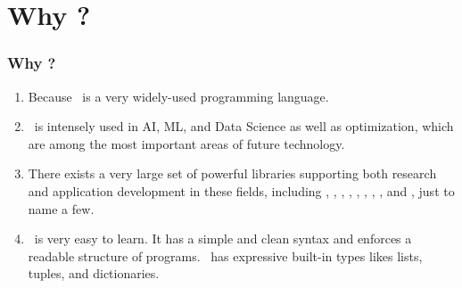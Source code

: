 \documentclass[aspectratio=169,mathserif,notheorems]{beamer}%
\begin{document}
\section{Why \python?}%
%
\begin{frame}[t]%
\frametitle{Why \python?}%
\begin{enumerate}%
\item Because \python\ is a very widely-used programming language\cite{CBST2024LOHPPTDDSAMLA,B2023G2GLS}.%
\item<3-> \python\ is intensely used in AI\cite{RN2022AIAMA}, ML\cite{SSBD2014UMLFTTA}, and Data Science\cite{G2019DSFSFPWP} as well as optimization, which are among the most important areas of future technology.%
\item<4-> There exists a very large set of powerful libraries supporting both research and application development in these fields, including \numpy\cite{HMvdWGVCWTBSKPHvKBHFdRWPGMSRWAGO2020APWN,DBvR2024ITN,J2018NPSCADSAWNSAM}, \pandas\cite{B2012DPWP,L2024PW}, \scikitlearn\cite{PVGMTGBPWDVPCBPD2011SMLIP,RLM2022MLWPAS}, \scipy\cite{VGOHRCBPWBvdWBWMMNJKLCPFMVLPCHQHARPvMS2020SFAFSCIP,J2018NPSCADSAWNSAM}, \tensorflow\cite{ABCCDDDGIIKLMMMSTVWWYZ2016TASFLSML,L2023TDDBTADMLMWT}, \pytorch\cite{PGMLBCKLGADKYDRTCSFBC2019PAISHPDLL,RLM2022MLWPAS}, \matplotlib\cite{H2007MA2GE,P2021HOMLPAVWP,J2018NPSCADSAWNSAM}, \simpy\cite{Z2024DESIEWS}, and \moptipy\cite{WW2023RSDEWASSAA}, just to name a few.%
%
\item<5-> \python\ is very easy to learn\cite{GPBS2006WCTIPIHSUP,VR1999CPFERPASEFTPOT}. %
It has a simple and clean syntax and enforces a readable structure of programs. %
\python\ has expressive built-in types likes lists, tuples, and dictionaries. %
\end{enumerate}%
%
%
\end{frame}%
%
%
\end{document}
